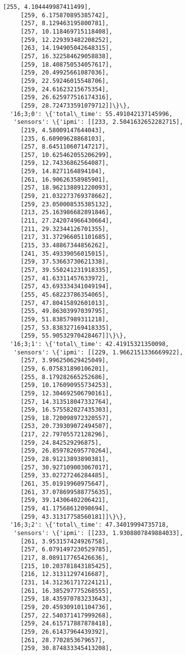 \documentclass[11pt]{article}
\begin{document}
\begin{tcolorbox}[breakable, size=fbox, boxrule=.5pt, pad at break*=1mm, opacityfill=0]
\begin{Verbatim}[commandchars=\\\{\}]
     [255, 4.104449987411499],
     [259, 6.175870895385742],
     [257, 8.129463195800781],
     [257, 10.118469715118408],
     [259, 12.229393482208252],
     [263, 14.194905042648315],
     [257, 16.322584629058838],
     [259, 18.408750534057617],
     [259, 20.49925661087036],
     [259, 22.59246015548706],
     [259, 24.61623215675354],
     [259, 26.625977516174316],
     [259, 28.724733591079712]]\}\},
  '16;3;0': \{'total\_time': 55.491042137145996,
   'sensors': \{'ipmi': [[233, 2.5041632652282715],
     [219, 4.58009147644043],
     [235, 6.60909628868103],
     [257, 8.645110607147217],
     [257, 10.625462055206299],
     [259, 12.74336862564087],
     [259, 14.8271164894104],
     [261, 16.90626358985901],
     [257, 18.962138891220093],
     [259, 21.032273769378662],
     [259, 23.050008535385132],
     [213, 25.163986682891846],
     [211, 27.242074966430664],
     [211, 29.32344126701355],
     [217, 31.372966051101685],
     [215, 33.48867344856262],
     [241, 35.49339056015015],
     [259, 37.53663730621338],
     [257, 39.550241231918335],
     [257, 41.63311457633972],
     [257, 43.693334341049194],
     [255, 45.68223786354065],
     [257, 47.80415892601013],
     [255, 49.86303997039795],
     [259, 51.83857989311218],
     [257, 53.838327169418335],
     [259, 55.90532970428467]]\}\},
  '16;3;1': \{'total\_time': 42.41915321350098,
   'sensors': \{'ipmi': [[229, 1.9662151336669922],
     [257, 3.996250629425049],
     [259, 6.075831890106201],
     [255, 8.179282665252686],
     [259, 10.176090955734253],
     [259, 12.304692506790161],
     [257, 14.313518047332764],
     [259, 16.575582027435303],
     [259, 18.720098972320557],
     [253, 20.739309072494507],
     [217, 22.79705572128296],
     [259, 24.842529296875],
     [259, 26.859782695770264],
     [259, 28.91213893890381],
     [257, 30.927109003067017],
     [259, 33.02727246284485],
     [261, 35.01919960975647],
     [261, 37.078699588775635],
     [259, 39.14306402206421],
     [259, 41.17568612098694],
     [259, 43.31317758560181]]\}\},
  '16;3;2': \{'total\_time': 47.34019994735718,
   'sensors': \{'ipmi': [[233, 1.9308807849884033],
     [261, 3.953157424926758],
     [257, 6.0791497230529785],
     [217, 8.089117765426636],
     [215, 10.203781843185425],
     [216, 12.31311297416687],
     [231, 14.312361717224121],
     [261, 16.385297775268555],
     [259, 18.435970783233643],
     [259, 20.459309101104736],
     [257, 22.540371417999268],
     [259, 24.615717887878418],
     [259, 26.61437964439392],
     [261, 28.7702853679657],
     [259, 30.874833345413208],

\end{Verbatim}
\end{tcolorbox}
\end{document}
